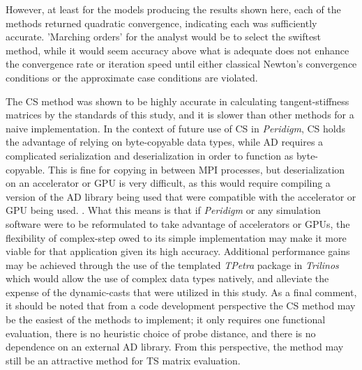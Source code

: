 \documentclass[preprint,12pt]{elsarticle}
\begin{document}
However, at least for the models producing the results shown here, each of the
methods returned quadratic convergence, indicating each was sufficiently
accurate. 'Marching orders' for the analyst would be to select the swiftest
method, while it would seem accuracy above what is adequate does not enhance
the convergence rate or iteration speed until either classical Newton's convergence
conditions or the approximate case conditions are violated. 

The CS method was shown to be highly accurate in calculating tangent-stiffness
matrices by the standards of this study, and it is slower than other methods
for a naive implementation. In the context of future use of CS in
\emph{Peridigm}, CS holds the advantage of relying on byte-copyable data types,
while AD requires a complicated serialization and deserialization in order to
function as byte-copyable. This is fine for copying in between MPI processes,
but deserialization on an accelerator or GPU is very difficult, as this would
require compiling a version of the AD library being used that were compatible
with the accelerator or GPU being used.  \cite{intel_byte_copyable}. What this means is that if
\emph{Peridigm} or any simulation software were to be reformulated to take
advantage of accelerators or GPUs, the flexibility of complex-step owed to its
simple implementation may make it more viable for that application given its
high accuracy. Additional performance gains may be achieved through the use of
the templated \emph{TPetra} package in \emph{Trilinos} which would allow the
use of complex data types natively, and alleviate the expense of the
dynamic-casts that were utilized in this study.  As a final comment, it should
be noted that from a code development perspective the CS method may be the
easiest of the methods to implement; it only requires one functional
evaluation, there is no heuristic choice of probe distance, and there is no
dependence on an external AD library.  From this perspective, the method may
still be an attractive method for TS matrix evaluation.  
\end{document}
